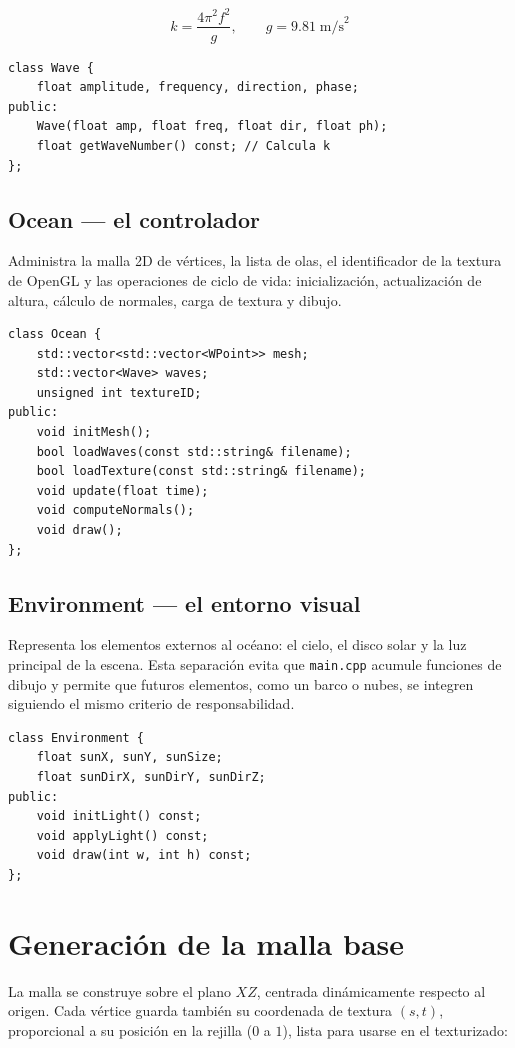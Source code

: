 ﻿\documentclass[11pt]{article}
\begin{document}
\[
k = \frac{4\pi^2 f^2}{g}, \qquad g = 9.81 \; \text{m/s}^2
\]

\begin{lstlisting}
class Wave {
    float amplitude, frequency, direction, phase;
public:
    Wave(float amp, float freq, float dir, float ph);
    float getWaveNumber() const; // Calcula k
};
\end{lstlisting}

\subsection{Ocean --- el controlador}

Administra la malla 2D de vértices, la lista de olas, el identificador de la
textura de OpenGL y las operaciones de ciclo de vida: inicialización,
actualización de altura, cálculo de normales, carga de textura y dibujo.

\begin{lstlisting}
class Ocean {
    std::vector<std::vector<WPoint>> mesh;
    std::vector<Wave> waves;
    unsigned int textureID;
public:
    void initMesh();
    bool loadWaves(const std::string& filename);
    bool loadTexture(const std::string& filename);
    void update(float time);
    void computeNormals();
    void draw();
};
\end{lstlisting}
\subsection{Environment --- el entorno visual}

Representa los elementos externos al océano: el cielo, el disco solar y la luz
principal de la escena. Esta separación evita que \texttt{main.cpp} acumule
funciones de dibujo y permite que futuros elementos, como un barco o nubes, se
integren siguiendo el mismo criterio de responsabilidad.

\begin{lstlisting}
class Environment {
    float sunX, sunY, sunSize;
    float sunDirX, sunDirY, sunDirZ;
public:
    void initLight() const;
    void applyLight() const;
    void draw(int w, int h) const;
};
\end{lstlisting}

\section{Generación de la malla base}

La malla se construye sobre el plano $XZ$, centrada dinámicamente respecto al
origen. Cada vértice guarda también su coordenada de textura $(s,t)$,
proporcional a su posición en la rejilla ($0$ a $1$), lista para usarse en el
texturizado:
\end{document}
